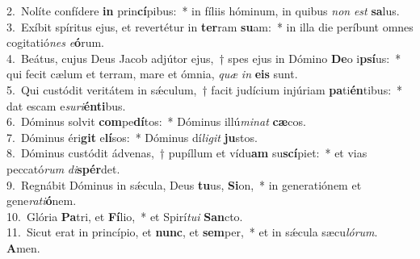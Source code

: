 {2.~}Nolíte confídere \textbf{in} prin\textbf{cí}pibus:~* in fíliis hóminum, in quibus \textit{non} \textit{est} \textbf{sa}lus.\\
{3.~}Exíbit spíritus ejus, et revertétur in \textbf{ter}ram \textbf{su}am:~* in illa die períbunt omnes cogitatió\textit{nes} \textit{e}\textbf{ó}rum.\\
{4.~}Beátus, cujus Deus Jacob adjútor ejus,~† spes ejus in Dómino \textbf{De}o i\textbf{psí}us:~* qui fecit cælum et terram, mare et ómnia, \textit{quæ} \textit{in} \textbf{e}\textbf{is} sunt.\\
{5.~}Qui custódit veritátem in sǽculum,~† facit judícium injúriam \textbf{pa}ti\textbf{én}tibus:~* dat escam e\textit{su}\textit{ri}\textbf{én}\textbf{ti}bus.\\
{6.~}Dóminus solvit \textbf{com}pe\textbf{dí}tos:~* Dóminus illú\textit{mi}\textit{nat} \textbf{cæ}cos.\\
{7.~}Dóminus éri\textbf{git} e\textbf{lí}sos:~* Dóminus dí\textit{li}\textit{git} \textbf{ju}stos.\\
{8.~}Dóminus custódit ádvenas,~† pupíllum et vídu\textbf{am} su\textbf{scí}piet:~* et vias peccató\textit{rum} \textit{di}\textbf{spér}det.\\
{9.~}Regnábit Dóminus in sǽcula, Deus \textbf{tu}us, \textbf{Si}on,~* in generatiónem et gene\textit{ra}\textit{ti}\textbf{ó}nem.\\
{10.~}Glória \textbf{Pa}tri, et \textbf{Fí}lio,~* et Spirí\textit{tu}\textit{i} \textbf{San}cto.\\
{11.~}Sicut erat in princípio, et \textbf{nunc}, et \textbf{sem}per,~* et in sǽcula sæcu\textit{ló}\textit{rum}. \textbf{A}men.\\
